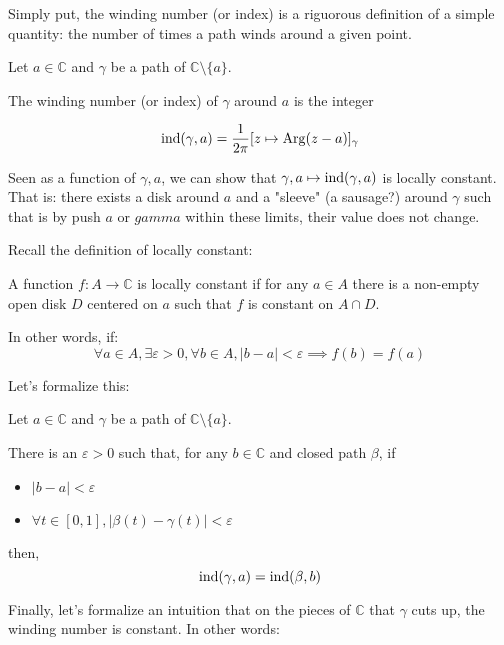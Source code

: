 Simply put, the winding number (or index) is a riguorous definition of a simple quantity: the number of times a path winds around a given point.

\begin{defi}
    Let $a\in\mathbb{C}$ and $\gamma$ be a path of $\mathbb{C} \setminus \lbrace a \rbrace$.
    
    The winding number (or index) of $\gamma$ around $a$ is the integer

    $$ \operatorname{ind}(\gamma, a) = \frac{1}{2\pi}[z \mapsto \operatorname{Arg}(z-a)]_\gamma $$
\end{defi}

Seen as a function of $\gamma, a$, we can show that $\gamma, a \mapsto \operatorname{ind}(\gamma, a)$ is locally constant. That is: there exists a disk around $a$ and a "sleeve" (a sausage?) around $\gamma$ such that is by push $a$ or $gamma$ within these limits, their value does not change.

Recall the definition of locally constant:

\begin{defi}
    A function $f: A \rightarrow \mathbb{C}$ is locally constant if for any $a\in A$ there is a non-empty open disk $D$ centered on $a$ such that $f$ is constant on $A\cap D$.

    In other words, if:
    $$ \forall a \in A, \exists \varepsilon >0, \forall b \in A, |b-a|< \varepsilon \implies f(b) = f(a) $$
\end{defi}

Let's formalize this:

\begin{thm*}
    Let $a\in\mathbb{C}$ and $\gamma$ be a path of $\mathbb{C} \setminus \lbrace a \rbrace$.
   
    There is an $\varepsilon > 0$ such that, for any $b\in \mathbb{C}$ and closed path $\beta$, if 
    \begin{itemize}
        \item $|b - a| < \varepsilon$
        \item $\forall t \in [0,1], |\beta(t) - \gamma(t)| < \varepsilon $
    \end{itemize}

    then, $$\operatorname{ind}(\gamma, a) = \operatorname{ind}(\beta, b)$$
\end{thm*}

Finally, let's formalize an intuition that on the pieces of $\mathbb{C}$ that $\gamma$ cuts up, the winding number is constant. In other words:

